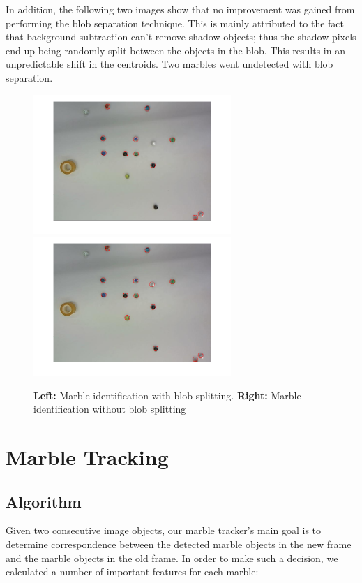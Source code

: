\documentclass[10pt,a4paper,onecolumn]{report}
\begin{document}
In addition, the following two images show that no improvement was gained from performing the blob separation technique. This is mainly attributed to the fact that background subtraction can't remove shadow objects; thus the shadow pixels end up being randomly split between the objects in the blob. This results in an unpredictable shift in the centroids. Two marbles went undetected with blob separation.



\begin{center}
	\begin{figure}[h!]
		\includegraphics[width=7.5cm]{blob_splitting_with1.png}
		\includegraphics[width=7.5cm]{blop_splitting_without1.png}
		\caption{\textbf{Left:} Marble identification with blob splitting.  \textbf{Right:} Marble identification without blob splitting}
	\end{figure}
\end{center}

\chapter{Marble Tracking}

\section{Algorithm}

Given two consecutive image objects, our marble tracker's main goal is to determine correspondence between the detected marble objects in the new frame and the marble objects in the old frame. In order to make such a decision, we calculated a number of important features for each marble:
\end{document}
